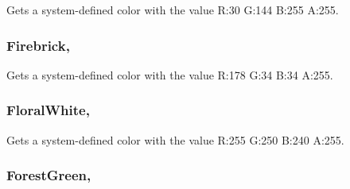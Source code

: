 Gets a system-\/defined color with the value R\+:30 G\+:144 B\+:255 A\+:255.

\hypertarget{structMicrosoft_1_1Xna_1_1Framework_1_1Color_ab0875aabc210eb8f9a0c3714ac0d5ca3}{}
\subsubsection[{Firebrick}]{ Firebrick\hspace{0.3cm}{\ttfamily [static]}, {\ttfamily [get]}}\label{structMicrosoft_1_1Xna_1_1Framework_1_1Color_ab0875aabc210eb8f9a0c3714ac0d5ca3}


Gets a system-\/defined color with the value R\+:178 G\+:34 B\+:34 A\+:255.

\hypertarget{structMicrosoft_1_1Xna_1_1Framework_1_1Color_a971eba50d5756242cd07c54c6ff5cb89}{}
\subsubsection[{Floral\+White}]{ Floral\+White\hspace{0.3cm}{\ttfamily [static]}, {\ttfamily [get]}}\label{structMicrosoft_1_1Xna_1_1Framework_1_1Color_a971eba50d5756242cd07c54c6ff5cb89}


Gets a system-\/defined color with the value R\+:255 G\+:250 B\+:240 A\+:255.

\hypertarget{structMicrosoft_1_1Xna_1_1Framework_1_1Color_a61f5d4fc4b86bf1071dd413d8cec0810}{}
\subsubsection[{Forest\+Green}]{ Forest\+Green\hspace{0.3cm}{\ttfamily [static]}, {\ttfamily [get]}}\label{structMicrosoft_1_1Xna_1_1Framework_1_1Color_a61f5d4fc4b86bf1071dd413d8cec0810}


